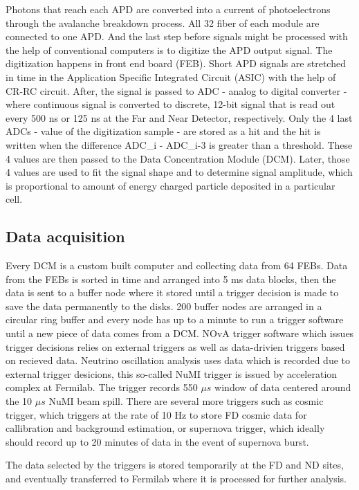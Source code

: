Photons that reach each APD are converted into a current of photoelectrons through the avalanche breakdown 
process. All 32 fiber of each module are connected to one APD. And the last step before signals might be 
processed with the 
help of conventional computers is to digitize the APD output signal. The digitization happens in
front end board (FEB). Short APD signals are stretched in time in the Application Specific 
Integrated Circuit (ASIC) with the help of CR-RC circuit. After, the signal is passed to ADC - 
analog to digital converter - where continuous signal is converted to discrete, 12-bit signal
that is read out every 500 ns or 125 ns at the Far and Near Detector, respectively. Only the 4 last ADCs - 
value of the digitization sample - are stored as a hit and the hit is written when the difference
\be
ADC_i - ADC_{i-3}
\ee
is greater than a threshold. These 4 values are then passed to the Data Concentration Module (DCM). 
Later, those 4 values are used to fit the signal shape and to determine signal amplitude, which 
is proportional to amount of energy charged particle deposited in a particular cell.

\subsection{Data acquisition}
Every DCM is a custom built computer and collecting data from 64 FEBs. Data from the FEBs
is sorted in time and arranged into 5 ms data blocks, then the data is sent to a buffer node where it 
stored until a trigger decision is made to save the data permanently to the disks. 200 buffer nodes 
are arranged in a circular ring buffer and every node has up to a minute to run a trigger software 
until a new piece of data comes from a DCM. NOvA trigger software which issues trigger decisions relies
on external triggers as well as data-drivien triggers based on recieved data. Neutrino oscillation
analysis uses data which is recorded due to external trigger desicions, this so-called NuMI trigger 
is issued by acceleration complex at Fermilab. The trigger records 550 $\mu s$ window of data centered 
around the 10 $\mu s$ NuMI beam spill. There are several more triggers such as cosmic trigger, which 
triggers at the rate of 10 Hz to store FD cosmic data for callibration and background estimation, or 
supernova trigger, which ideally should record up to 20 minutes of data in the event of supernova burst.

The data selected by the triggers is stored temporarily at the FD and ND sites, and eventually transferred
to Fermilab where it is processed for further analysis.

